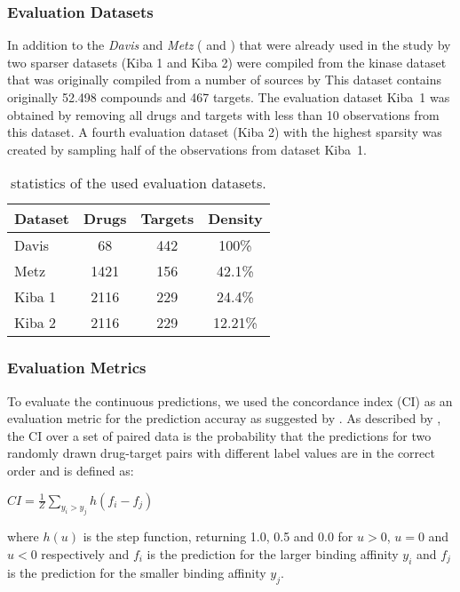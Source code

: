 \documentclass[
journal=jacsat, %
manuscript=article]{achemso}
\begin{document}
\subsubsection{Evaluation Datasets}
In addition to the \textit{Davis} and \textit{Metz} (\citeauthor{davis2011comprehensive} and \citeauthor{metz2011navigating}) that were already used in the study by \citeauthor{pahikkala2014toward} two sparser datasets (Kiba 1 and Kiba 2) were compiled from the kinase dataset that was originally compiled from a number of sources by \citeauthor{doi:10.1021/ci400709d} This dataset contains originally 52.498 compounds and 467 targets. The evaluation dataset \mbox{Kiba 1} was obtained by removing all drugs and targets with less than 10 observations from this dataset. A fourth evaluation dataset (Kiba 2) with the highest sparsity was created by sampling half of the observations from dataset \mbox{Kiba 1}.
\begin{table}[]
\centering
\begin{tabular}{l c c c}
Dataset & Drugs & Targets & Density \\
\hline
Davis & 68 & 442 & 100\%\\
Metz & 1421 & 156 & 42.1\%\\
Kiba 1 & 2116 & 229 & 24.4\%\\
Kiba 2 & 2116& 229 & 12.21\%\\
\end{tabular}
\caption{statistics of the used evaluation datasets.}
\label{dataset_stats}
\end{table}

\subsubsection{Evaluation Metrics}
To evaluate the continuous predictions, we used the concordance index (CI) as an evaluation metric for the prediction accuray as suggested by \citeauthor{pahikkala2014toward}. As described by \citeauthor{pahikkala2014toward}, the CI over a set of paired data is the probability that the predictions for two randomly drawn drug-target pairs with different label values are in the correct order and is defined as:
\begin{center}
$CI = \frac{1}{Z}\sum\limits_{y_i> y_j}h(f_i-f_j)$
\end{center}
where $h(u)$ is the step function, returning 1.0, 0.5 and 0.0 for $u>0$, $u=0$ and $u<0$ respectively and $f_i$ is the prediction for the larger binding affinity $y_i$ and $f_j$ is the prediction for the smaller binding affinity $y_j$.
\end{document}
